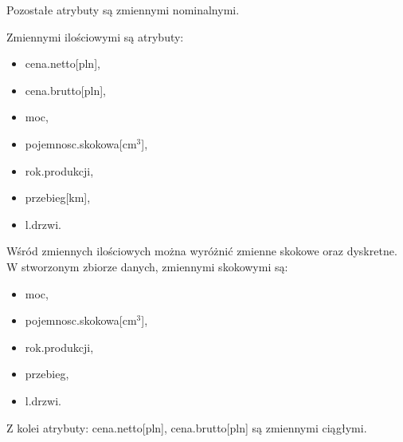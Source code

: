 \documentclass[12pt,a4paper]{report}
\begin{document}
Pozostałe atrybuty są zmiennymi nominalnymi.

Zmiennymi ilościowymi są atrybuty:
\begin{multicols}{3}
\begin{itemize}
 \item cena.netto[pln],%
 \item cena.brutto[pln],%
 \item moc,%
 \item pojemnosc.skokowa[cm$^3$],%
 \item rok.produkcji, %
 \item przebieg[km],%
 \item l.drzwi. %
\end{itemize}
\end{multicols}

Wśród zmiennych ilościowych można wyróżnić zmienne skokowe oraz dyskretne. W stworzonym zbiorze danych, zmiennymi skokowymi są: 
\begin{multicols}{3}
\begin{itemize}
	\item moc, %
	\item pojemnosc.skokowa[cm$^3$], %
	\item rok.produkcji, %
	\item przebieg, %
	\item l.drzwi. %

\end{itemize}
\end{multicols}
Z kolei atrybuty: cena.netto[pln], cena.brutto[pln] są zmiennymi ciągłymi. 










\end{document}
